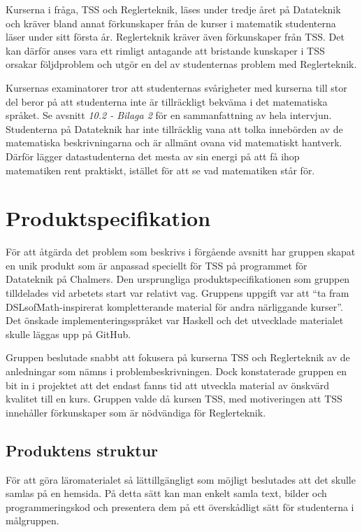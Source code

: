 \documentclass[12pt,a4paper,twoside,openright]{article}
\begin{document}
Kurserna i fråga, TSS och Reglerteknik, läses under tredje året på
Datateknik och kräver bland annat förkunskaper från de kurser i
matematik studenterna läser under sitt första år. Reglerteknik kräver
även förkunskaper från TSS. Det kan därför anses vara ett rimligt
antagande att bristande kunskaper i TSS orsakar följdproblem och utgör
en del av studenternas problem med Reglerteknik.

Kursernas examinatorer tror att studenternas svårigheter med kurserna
till stor del beror på att studenterna inte är tillräckligt bekväma i
det matematiska språket. Se avsnitt \textit{10.2 - Bilaga 2} för en sammanfattning av hela intervjun.
Studenterna på Datateknik har inte
tillräcklig vana att tolka innebörden av de matematiska
beskrivningarna och är allmänt ovana vid matematiskt hantverk. Därför
lägger datastudenterna det mesta av sin energi på att få ihop
matematiken rent praktiskt, istället för att se vad matematiken står
för.

\section{Produktspecifikation}

För att åtgärda det problem som beskrivs i förgående avsnitt har
gruppen skapat en unik produkt som är anpassad speciellt för TSS på
programmet för Datateknik på Chalmers. Den ursprungliga
produktspecifikationen som gruppen tilldelades vid arbetets start var
relativt vag. Gruppens uppgift var att ``ta fram DSLsofMath-inspirerat
kompletterande material för andra närliggande kurser''. Det önskade
implementeringsspråket var Haskell och det utvecklade materialet skulle läggas upp på GitHub.

Gruppen beslutade snabbt att fokusera på kurserna TSS och Reglerteknik
av de anledningar som nämns i problembeskrivningen. Dock konstaterade
gruppen en bit in i projektet att det endast fanns tid att utveckla
material av önskvärd kvalitet till en kurs. Gruppen valde då kursen
TSS, med motiveringen att TSS innehåller förkunskaper som är
nödvändiga för Reglerteknik.

\subsection{Produktens struktur}
\label{sec:prodSpec}
För att göra läromaterialet så lättillgängligt som möjligt beslutades att
det skulle samlas på en hemsida. På detta sätt kan man enkelt
samla text, bilder och programmeringskod och presentera dem på ett
överskådligt sätt för studenterna i målgruppen.
\end{document}

